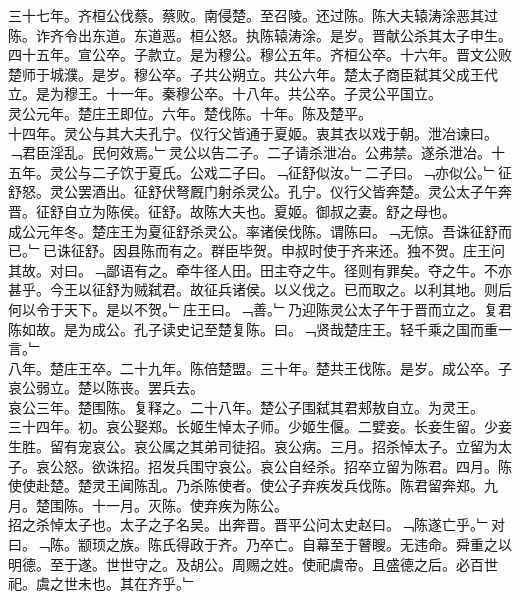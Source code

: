 \documentclass{zhvt-classic}
\begin{document}
\hspace*{2em}三十七年。齐桓公伐蔡。蔡败。南侵楚。至召陵。还过陈。陈大夫辕涛涂恶其过陈。诈齐令出东道。东道恶。桓公怒。执陈辕涛涂。是岁。晋献公杀其太子申生。\\
\hspace*{2em}四十五年。宣公卒。子款立。是为穆公。穆公五年。齐桓公卒。十六年。晋文公败楚师于城濮。是岁。穆公卒。子共公朔立。共公六年。楚太子商臣弑其父成王代立。是为穆王。十一年。秦穆公卒。十八年。共公卒。子灵公平国立。\\
\hspace*{2em}灵公元年。楚庄王即位。六年。楚伐陈。十年。陈及楚平。\\
\hspace*{2em}十四年。灵公与其大夫孔宁。仪行父皆通于夏姬。衷其衣以戏于朝。泄冶谏曰。﹁君臣淫乱。民何效焉。﹂灵公以告二子。二子请杀泄冶。公弗禁。遂杀泄冶。十五年。灵公与二子饮于夏氏。公戏二子曰。﹁征舒似汝。﹂二子曰。﹁亦似公。﹂征舒怒。灵公罢酒出。征舒伏弩厩门射杀灵公。孔宁。仪行父皆奔楚。灵公太子午奔晋。征舒自立为陈侯。征舒。故陈大夫也。夏姬。御叔之妻。舒之母也。\\
\hspace*{2em}成公元年冬。楚庄王为夏征舒杀灵公。率诸侯伐陈。谓陈曰。﹁无惊。吾诛征舒而已。﹂已诛征舒。因县陈而有之。群臣毕贺。申叔时使于齐来还。独不贺。庄王问其故。对曰。﹁鄙语有之。牵牛径人田。田主夺之牛。径则有罪矣。夺之牛。不亦甚乎。今王以征舒为贼弑君。故征兵诸侯。以义伐之。已而取之。以利其地。则后何以令于天下。是以不贺。﹂庄王曰。﹁善。﹂乃迎陈灵公太子午于晋而立之。复君陈如故。是为成公。孔子读史记至楚复陈。曰。﹁贤哉楚庄王。轻千乘之国而重一言。﹂\\
\hspace*{2em}八年。楚庄王卒。二十九年。陈倍楚盟。三十年。楚共王伐陈。是岁。成公卒。子哀公弱立。楚以陈丧。罢兵去。\\
\hspace*{2em}哀公三年。楚围陈。复释之。二十八年。楚公子围弑其君郏敖自立。为灵王。\\
\hspace*{2em}三十四年。初。哀公娶郑。长姬生悼太子师。少姬生偃。二嬖妾。长妾生留。少妾生胜。留有宠哀公。哀公属之其弟司徒招。哀公病。三月。招杀悼太子。立留为太子。哀公怒。欲诛招。招发兵围守哀公。哀公自经杀。招卒立留为陈君。四月。陈使使赴楚。楚灵王闻陈乱。乃杀陈使者。使公子弃疾发兵伐陈。陈君留奔郑。九月。楚围陈。十一月。灭陈。使弃疾为陈公。\\
\hspace*{2em}招之杀悼太子也。太子之子名吴。出奔晋。晋平公问太史赵曰。﹁陈遂亡乎。﹂对曰。﹁陈。颛顼之族。陈氏得政于齐。乃卒亡。自幕至于瞽瞍。无违命。舜重之以明德。至于遂。世世守之。及胡公。周赐之姓。使祀虞帝。且盛德之后。必百世祀。虞之世未也。其在齐乎。﹂\\
\end{document}
